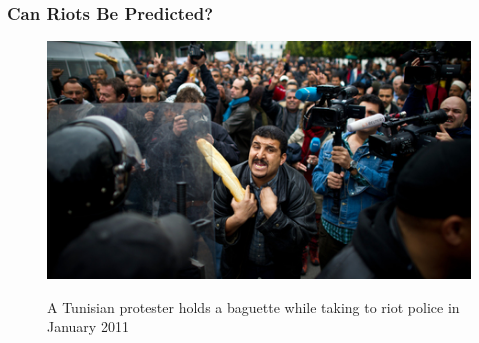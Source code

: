 \documentclass[hyperref={colorlinks=false},handout,10pt]{beamer}
\let\olditem\item
\renewcommand{\item}{\setlength{\itemsep}{0.5\baselineskip}\olditem}
\begin{document}
\begin{frame}
    \frametitle{Can Riots Be Predicted?}
    \begin{figure}
        \caption{A Tunisian protester holds a baguette while taking to riot police in January 2011}
        \begin{center}
            \href{http://www.npr.org/blogs/thesalt/2012/09/20/161501075/high-food-prices-forcast-more-global-riots-ahead-researchers-say}{\includegraphics[width=\textwidth]{images/food_riot.jpg}}
        \end{center}  
    \end{figure}
\end{frame}

\end{document}
